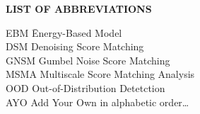 {}

\begin{center}
{\normalfont \textbf{LIST OF ABBREVIATIONS}}
\end{center}

\newcommand{\Ab}[2]{\noindent  #1 \> #2 \\}
\newcommand{\Abi}[2]{\noindent #1 \hspace{1.5cm} \= #2 \\}

\begin{tabbing}
\Abi{EBM}{Energy-Based Model}
\Ab{DSM}{Denoising Score Matching}
\Ab{GNSM}{Gumbel Noise Score Matching}
\Ab{MSMA}{Multiscale Score Matching Analysis}
\Ab{OOD}{Out-of-Distribution Detetction}
\Ab{AYO}{Add Your Own in alphabetic order\ldots}
\end{tabbing}

\clearpage
